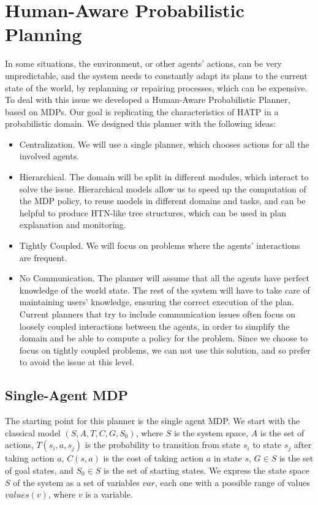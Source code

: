 \section{Human-Aware Probabilistic Planning}
\label{subsec:plan_management-happ}

In some situations, the environment, or other agents' actions, can be very unpredictable, and the system needs to constantly adapt its plans to the current state of the world, by replanning or repairing processes, which can be expensive. To deal with this issue we developed a Human-Aware Probabilistic Planner, based on MDPs. Our goal is replicating the characteristics of HATP in a probabilistic domain. We designed this planner with the following ideas:

\begin{itemize}
\item Centralization. We will use a single planner, which chooses actions for all the involved agents.
\item Hierarchical. The domain will be split in different modules, which interact to solve the issue. Hierarchical models allow us to speed up the computation of the MDP policy, to reuse models in different domains and tasks, and can be helpful to produce HTN-like tree structures, which can be used in plan explanation and monitoring.
\item Tightly Coupled. We will focus on problems where the agents' interactions are frequent.
\item No Communication. The planner will  assume that all the agents have perfect knowledge of the world state. The rest of the system will have to take care of maintaining users' knowledge, ensuring the correct execution of the plan. Current planners that try to include communication issues often focus on loosely coupled interactions between the agents, in order to simplify the domain and be able to compute a policy for the problem. Since we choose to focus on tightly coupled problems, we can not use this solution, and so prefer to avoid the issue at this level.
\end{itemize}


\subsection{Single-Agent MDP}
The starting point for this planner is the single agent MDP. We start with the classical model $(S,A,T,C,G,S_0)$, where $S$ is the system space, $A$ is the set of actions, $T(s_i,a,s_j)$ is the probability to transition from state $s_i$ to state $s_j$ after taking action $a$, $C(s,a)$ is the cost of taking action $a$ in state $s$, $G \in S$ is the set of goal states, and $S_0 \in S$ is the set of starting states. We express the state space $S$ of the system as a set of variables $var$, each one with a possible range of values $values(v)$, where $v$ is a variable.

